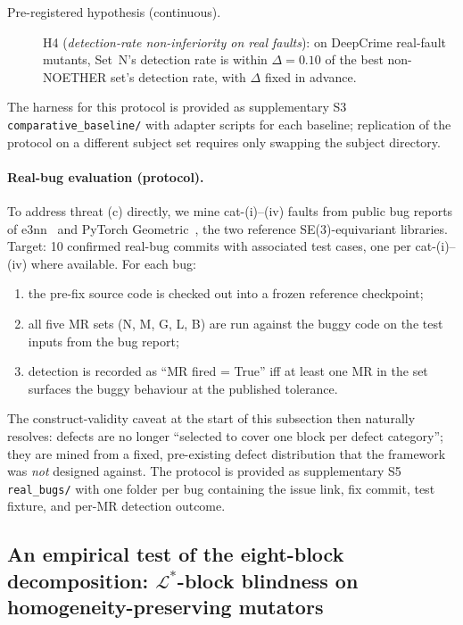 \documentclass[acmsmall, screen]{acmart}
\begin{document}
\begin{description}
  \item[Pre-registered hypothesis (continuous).] H4 (\emph{detection-rate non-inferiority on real faults}): on DeepCrime real-fault mutants, Set~N's detection rate is within $\Delta = 0.10$ of the best non-NOETHER set's detection rate, with $\Delta$ fixed in advance.
\end{description}

The harness for this protocol is provided as supplementary S3 \texttt{comparative\_baseline/} with adapter scripts for each baseline; replication of the protocol on a different subject set requires only swapping the subject directory.

\paragraph{Real-bug evaluation (protocol).}
\label{para:real-bug-protocol}
To address threat (c) directly, we mine cat-(i)--(iv) faults from public bug reports of e3nn~\cite{e3nn2022software} and PyTorch Geometric~\cite{Fey2019PyG}, the two reference SE(3)-equivariant libraries. Target: 10 confirmed real-bug commits with associated test cases, one per cat-(i)--(iv) where available. For each bug:
\begin{enumerate}[leftmargin=*,nosep]
  \item the pre-fix source code is checked out into a frozen reference checkpoint;
  \item all five MR sets (N, M, G, L, B) are run against the buggy code on the test inputs from the bug report;
  \item detection is recorded as ``MR fired = True'' iff at least one MR in the set surfaces the buggy behaviour at the published tolerance.
\end{enumerate}
The construct-validity caveat at the start of this subsection then naturally resolves: defects are no longer ``selected to cover one block per defect category''; they are mined from a fixed, pre-existing defect distribution that the framework was \emph{not} designed against. The protocol is provided as supplementary S5 \texttt{real\_bugs/} with one folder per bug containing the issue link, fix commit, test fixture, and per-MR detection outcome.

\subsection{An empirical test of the eight-block decomposition: \texorpdfstring{$\mathcal{L}^{*}$}{L*}-block blindness on homogeneity-preserving mutators}
\label{sec:empirical-vs-sota}
\end{document}
